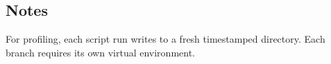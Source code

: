 \documentclass{article}
\begin{document}
\subsection{Notes}

For profiling, each script run writes to a fresh timestamped directory. Each branch requires its own virtual environment.





\end{document}
